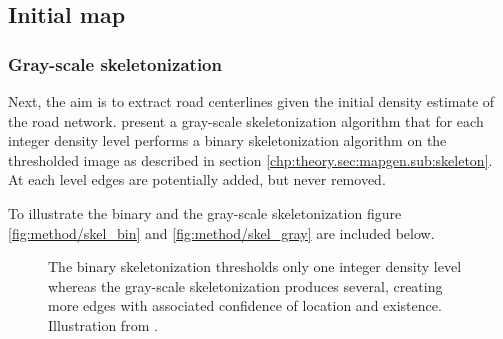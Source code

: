 \subsection{Initial map}

\subsubsection{Gray-scale skeletonization}

Next, the aim is to extract road centerlines given the initial density estimate of the road network. \cite{biagioni:gis12} present a gray-scale skeletonization algorithm that for each integer density level performs a binary skeletonization algorithm on the thresholded image as described in section \ref{chp:theory.sec:mapgen.sub:skeleton}. At each level edges are potentially added, but never removed. %

To illustrate the binary and the gray-scale skeletonization figure \ref{fig:method/skel_bin} and \ref{fig:method/skel_gray} are included below. 

\begin{figure}%
 \centering
 \caption{The binary skeletonization thresholds only one integer density level whereas the gray-scale skeletonization produces several, creating more edges with associated confidence of location and existence. Illustration from \citep{biagioni:gis12}.}%
 \label{fig:method/skel}
\end{figure}

